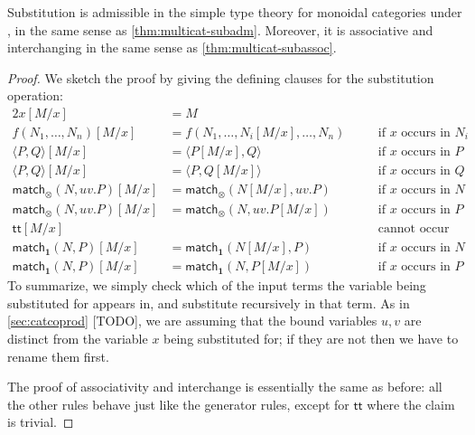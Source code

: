 \documentclass{book}
\def\ttt{\mathsf{tt}}
\def\pair#1#2{\langle #1,#2\rangle}
\def\match{\mathsf{match}}
\def\one{\mathbf{1}}
\let\tensor\otimes
\begin{document}
\begin{lem}\label{thm:moncat-subadm}
  Substitution is admissible in the simple type theory for monoidal categories under \cG, in the same sense as \cref{thm:multicat-subadm}.
  Moreover, it is associative and interchanging in the same sense as \cref{thm:multicat-subassoc}.
\end{lem}
\begin{proof}
  We sketch the proof by giving the defining clauses for the substitution operation:
  \begin{alignat*}{2}
    x[M/x] &= M\\
    f(N_1,\dots,N_n)[M/x] &= f(N_1,\dots,N_i[M/x],\dots,N_n) &&\quad\text{if $x$ occurs in $N_i$}\\
    \pair P Q[M/x] &= \pair{P[M/x]}{Q} &&\quad\text{if $x$ occurs in $P$}\\
    \pair P Q[M/x] &= \pair{P}{Q[M/x]} &&\quad\text{if $x$ occurs in $Q$}\\
    \match_\tensor(N,uv.P)[M/x] &= \match_\tensor(N[M/x],uv.P) &&\quad\text{if $x$ occurs in $N$}\\
    \match_\tensor(N,uv.P)[M/x] &= \match_\tensor(N,uv.P[M/x]) &&\quad\text{if $x$ occurs in $P$}\\
    \ttt[M/x] &&&\quad\text{cannot occur}\\
    \match_\one(N,P)[M/x] &= \match_\one(N[M/x],P) &&\quad\text{if $x$ occurs in $N$}\\
    \match_\one(N,P)[M/x] &= \match_\one(N,P[M/x]) &&\quad\text{if $x$ occurs in $P$}
  \end{alignat*}
  To summarize, we simply check which of the input terms the variable being substituted for appears in, and substitute recursively in that term.
  As in \cref{sec:catcoprod} [TODO], we are assuming that the bound variables $u,v$ are distinct from the variable $x$ being substituted for; if they are not then we have to rename them first.

  The proof of associativity and interchange is essentially the same as before: all the other rules behave just like the generator rules, except for $\ttt$ where the claim is trivial.
\end{proof}
\end{document}
